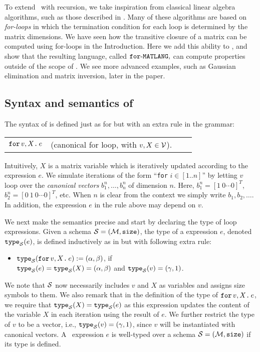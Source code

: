 
To extend \lang\ with recursion, we take inspiration from classical linear algebra algorithms, such as those described in \cite{num}. Many of these algorithms are based on \textit{for-loops} in which the termination condition for each loop is determined by the matrix dimensions. We have seen how the transitive closure of a matrix can be computed using for-loops in the Introduction. Here we add this ability to \lang, and show that the resulting language, called $\texttt{for}\text{-}\texttt{MATLANG},$ can compute properties outside of the scope of \lang. We see more advanced examples, such as Gaussian elimination and matrix inversion, later in the paper. 

\subsection{Syntax and semantics of \langfor} The syntax of \langfor is defined just as for \lang but with an extra rule in the grammar:
\medskip

\begin{tabular}{lcll}
 $\texttt{for}\, v,X \texttt{.}\, e$ & (canonical for loop, with $v, X \in \mathcal{V}$). 
\end{tabular}

\medskip
\noindent Intuitively, $X$ is a matrix variable which is iteratively updated according to the expression $e$. We simulate iterations of the form ``\texttt{for} $i\in [1..n]$'' by letting $v$ loop over the \textit{canonical vectors} $b_1^n,\ldots,b_n^n$ of dimension $n$. Here,
$b_1^n = [1\ 0 \cdots 0]^T$, $b_2^n = [0\ 1\ 0 \cdots 0]^T$, etc. When $n$ is clear from the context we simply write $b_1,b_2,\ldots$. In addition, the expression $e$ in the rule above may depend on $v$. 

We next make the semantics precise and start by
declaring the type of loop expressions.
Given a schema $\mathcal{S}=(\mathcal{M},\texttt{size})$, the type of a \langfor expression $e$, denoted $\texttt{type}_{\mathcal{S}}(e)$, is defined inductively as in \lang but with following extra rule:
\begin{itemize}
\item $\texttt{type}_{\mathcal{S}}(\texttt{for}\, v,X \texttt{.}\, e) := (\alpha,\beta)$, if \\
$\texttt{type}_{\mathcal{S}}(e)=\texttt{type}_{\mathcal{S}}(X) =(\alpha,\beta)$ and $\texttt{type}_{\mathcal{S}}(v) = (\gamma,1)$.
\end{itemize}
We note that $\mathcal{S}$ now necessarily includes $v$ and $X$ as variables and assigns size symbols to them.
We also remark that in the definition of the type of $\texttt{for}\, v,X \texttt{.}\, e$, we require that $\texttt{type}_{\mathcal{S}}(X) = \texttt{type}_{\mathcal{S}}(e)$ as this expression updates the content of the variable $X$ in each iteration using the result of $e$. We further restrict the type of 
$v$ to be a vector, i.e., $\texttt{type}_{\mathcal{S}}(v)=(\gamma,1)$, since $v$ will be instantiated with canonical vectors.
A \langfor\ expression $e$ is well-typed over a schema $\mathcal{S}=(\mathcal{M},\texttt{size})$ if its type is defined. 

